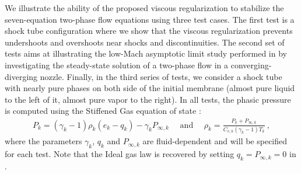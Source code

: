 We illustrate the ability of the proposed viscous regularization to stabilize the 
seven-equation two-phase flow equations using three test cases. 
The first test is a shock tube configuration where we show that the viscous regularization prevents undershoots 
and overshoots near shocks and discontinuities. The second set of tests aims at illustrating the low-Mach asymptotic limit study performed in  by investigating the steady-state solution
of a two-phase flow in a converging-diverging nozzle. Finally, in the third series of tests, we
consider a shock tube with nearly pure phases on both side of the initial membrane 
(almost pure liquid to the left of it, almost pure vapor to the right). 
In all tests, the phasic pressure is computed using the Stiffened Gas equation of state \cite{SGEOS}:
%
\begin{align}\label{eq:sgeos}
P_k = (\gamma_k-1) \rho_k( e_k -q_k) -\gamma_k P_{\infty,k} \quad \text{ and } \quad 
\rho_k = \frac{P_k+P_{\infty,k}}{C_{v,k} (\gamma_k-1)T_k} \ ,
\end{align}
%
where the parameters $\gamma_k$, $q_k$ and $P_{\infty,k}$ are fluid-dependent and will be specified for each test. Note that the Ideal gas law is recovered by setting 
$q_k = P_{\infty,k}=0$ in .
%
